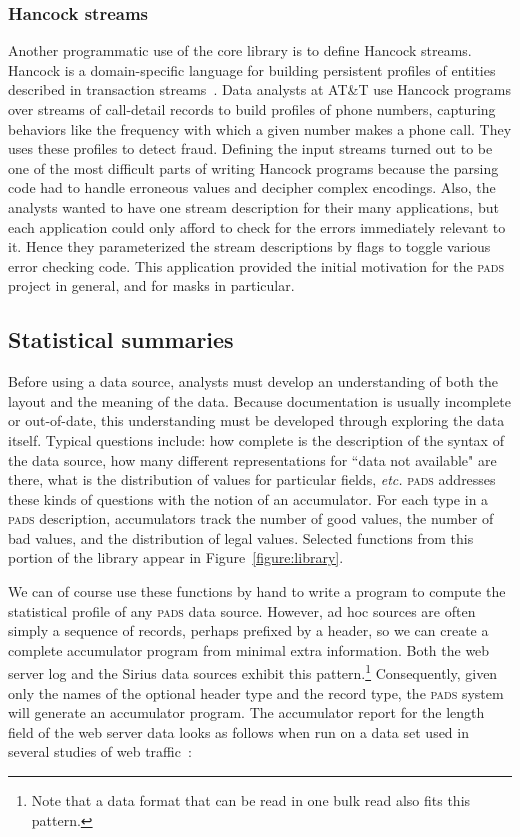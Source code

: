 \documentclass{sigplanconf}
\newcommand{\dibbler}{Sirius}
\newcommand{\figref}[1]{Figure~\ref{#1}}
\newcommand{\etc}{{\em etc.\/}}
\newcommand{\pads}{\textsc{pads}}
\begin{document}
\subsubsection{Hancock streams}
Another programmatic use of the core library is to define  
Hancock streams.  Hancock is a domain-specific language for
building persistent profiles of entities described in transaction 
streams~\cite{hancock-toplas}.  Data analysts at AT\&T use Hancock 
programs over streams of call-detail records to build 
profiles of phone numbers, capturing behaviors like the frequency with which a given number makes a phone call.  They uses these profiles
to detect fraud. 
Defining the input streams turned out to be one of the most
difficult parts of writing Hancock programs because the parsing
code had to handle erroneous values and decipher complex encodings.  
Also, the analysts wanted to have one stream description for their
many applications, but each application could only afford to check for the errors immediately relevant to it.  Hence they parameterized the 
stream descriptions by flags to toggle various error checking code.
This application provided the initial motivation for the \pads{} project
in general, and for masks in particular.

\subsection{Statistical summaries}
Before using a data source, analysts must develop an understanding 
of both the layout and the meaning of the data.  
Because documentation is usually
incomplete or out-of-date, this understanding must be developed 
through exploring the data itself.  Typical questions include:
how complete is the description of the syntax of the data source,
how many different representations for ``data not available" are there,
what is the distribution of values for particular fields, \etc{}
\pads{} addresses these kinds of questions with the notion of an accumulator. 
For each type in a \pads{} description, accumulators track the number of good values, the number of bad values, and the 
distribution of legal values.  Selected functions from this portion of the library appear in \figref{figure:library}.  

We can of course use these functions by hand to write
a program to compute the statistical profile of any \pads{} data source.
However, ad hoc sources are often simply a sequence of records, perhaps prefixed by a header, so we can create a complete accumulator program from minimal extra information.  Both the web server log and the \dibbler{} data sources exhibit this pattern.\footnote{
  Note that a data format that can be read in one bulk read also fits this pattern.
} 
Consequently, given only the names of the optional
header type and the record type, the \pads{} system will generate 
an accumulator program.  The accumulator report for the length field
of the web server data looks as follows when run on a data set used
in several studies of web traffic~\cite{clf-cluster,clf-adaptation}:
\end{document}
